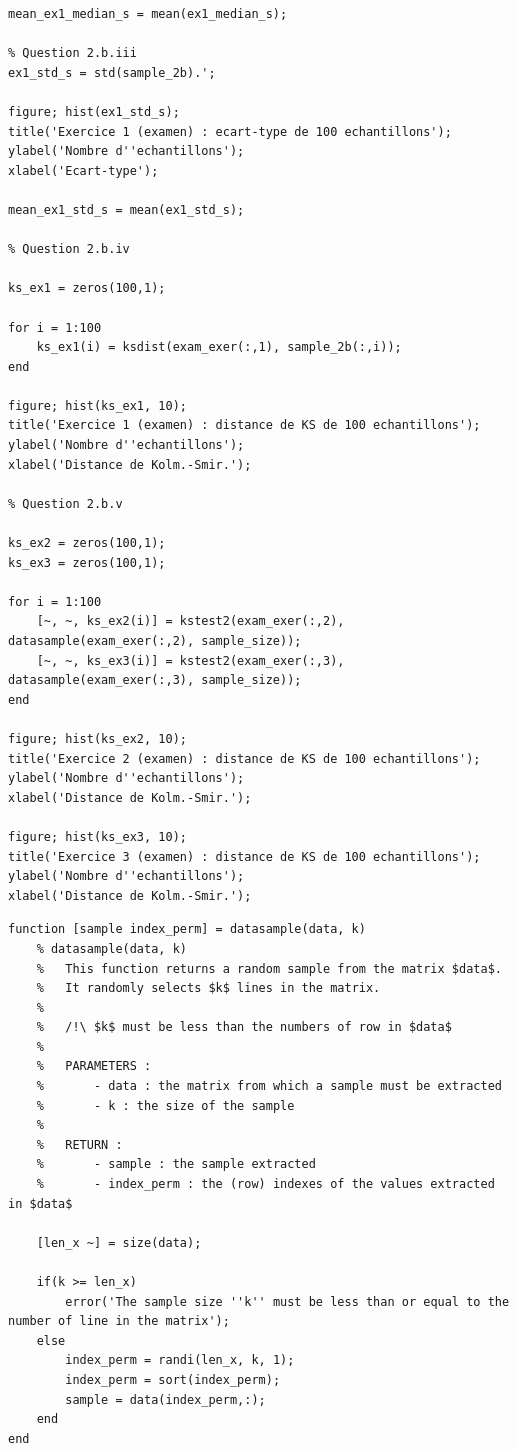 \documentclass[a4paper,11pt]{article}
\begin{document}
\begin{lstlisting}[caption={\texttt{Question2.m}}]
mean_ex1_median_s = mean(ex1_median_s);

% Question 2.b.iii
ex1_std_s = std(sample_2b).';

figure; hist(ex1_std_s);
title('Exercice 1 (examen) : ecart-type de 100 echantillons');
ylabel('Nombre d''echantillons');
xlabel('Ecart-type');

mean_ex1_std_s = mean(ex1_std_s);

% Question 2.b.iv 

ks_ex1 = zeros(100,1);

for i = 1:100
	ks_ex1(i) = ksdist(exam_exer(:,1), sample_2b(:,i));
end

figure; hist(ks_ex1, 10);
title('Exercice 1 (examen) : distance de KS de 100 echantillons');
ylabel('Nombre d''echantillons');
xlabel('Distance de Kolm.-Smir.');

% Question 2.b.v

ks_ex2 = zeros(100,1);
ks_ex3 = zeros(100,1);

for i = 1:100
	[~, ~, ks_ex2(i)] = kstest2(exam_exer(:,2), datasample(exam_exer(:,2), sample_size));
	[~, ~, ks_ex3(i)] = kstest2(exam_exer(:,3), datasample(exam_exer(:,3), sample_size));
end

figure; hist(ks_ex2, 10);
title('Exercice 2 (examen) : distance de KS de 100 echantillons');
ylabel('Nombre d''echantillons');
xlabel('Distance de Kolm.-Smir.');

figure; hist(ks_ex3, 10);
title('Exercice 3 (examen) : distance de KS de 100 echantillons');
ylabel('Nombre d''echantillons');
xlabel('Distance de Kolm.-Smir.');
\end{lstlisting}
\begin{lstlisting}[caption={\texttt{datasample.m}}]
function [sample index_perm] = datasample(data, k)
	% datasample(data, k)
	%	This function returns a random sample from the matrix $data$.
	%	It randomly selects $k$ lines in the matrix. 
	% 
	%	/!\ $k$ must be less than the numbers of row in $data$
	%	
	%	PARAMETERS :
	%		- data : the matrix from which a sample must be extracted
	%		- k : the size of the sample
	%
	%	RETURN :
	%		- sample : the sample extracted
	%		- index_perm : the (row) indexes of the values extracted in $data$ 

	[len_x ~] = size(data);

	if(k >= len_x)
		error('The sample size ''k'' must be less than or equal to the number of line in the matrix');
	else
		index_perm = randi(len_x, k, 1);
		index_perm = sort(index_perm);
		sample = data(index_perm,:);
	end
end
\end{lstlisting}
\end{document}
